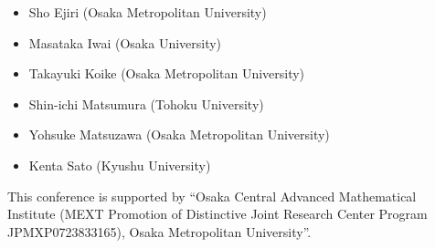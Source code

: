 \documentclass[dvipdfmx,a4paper,12pt]{article}
\theoremstyle{plain} %
\theoremstyle{definition} %
\begin{document}

\newpage

\begin{itemize}
  \setlength{\parskip}{0cm} 
  \setlength{\itemsep}{0cm}
\item Sho Ejiri (Osaka Metropolitan University)
\item Masataka Iwai (Osaka University)
\item Takayuki Koike (Osaka Metropolitan University)
\item Shin-ichi Matsumura (Tohoku University)
\item Yohsuke Matsuzawa (Osaka Metropolitan University)
\item Kenta Sato (Kyushu University)
  \end{itemize}
  
  

This conference is supported by “Osaka Central Advanced Mathematical Institute (MEXT Promotion of Distinctive Joint Research Center Program JPMXP0723833165), Osaka Metropolitan University”.
\end{document}
